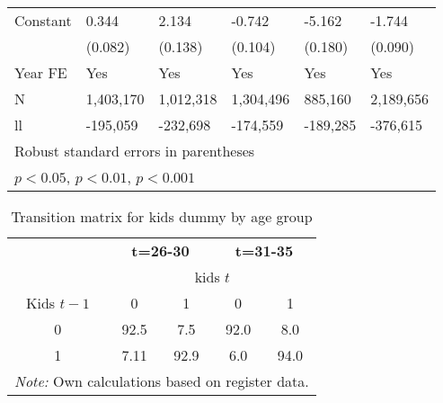 \begin{table}[h!]
\begin{tabular}{p{5cm} p{2cm}p{2cm}p{2cm}p{2cm}p{2cm}}
Constant            &       0.344\sym{***}&       2.134\sym{***}&      -0.742\sym{***}&      -5.162\sym{***}&      -1.744\sym{***}\\
                    &     (0.082)         &     (0.138)         &     (0.104)         &     (0.180)         &     (0.090)         \\

Year FE             &         Yes         &         Yes         &         Yes         &         Yes         &         Yes         \\
\midrule
N                   &     1,403,170         &     1,012,318         &     1,304,496         &      885,160         &     2,189,656         \\
ll                  &   -195,059         &   -232,698         &   -174,559         &   -189,285         &   -376,615         \\
\bottomrule
\multicolumn{6}{l}{\footnotesize Robust standard errors in parentheses}\\
\multicolumn{6}{l}{\footnotesize \sym{*} \(p<0.05\), \sym{**} \(p<0.01\), \sym{***} \(p<0.001\)}\\
\end{tabular}
\end{table}


\renewcommand{\arraystretch}{1}
\begin{table}[h!]\centering
\footnotesize
\def\sym#1{\ifmmode^{#1}\else\(^{#1}\)\fi}
\caption{Transition matrix for kids dummy by age group \label{tab:apkids}}
\begin{tabular}{c|cc|cc}
\toprule
                    &\multicolumn{2}{c}{  \textbf{t=26-30}  }&\multicolumn{2}{c}{\textbf{t=31-35}}\\
                    &\multicolumn{4}{c}{ kids $t$}\\
\midrule
 Kids $t-1$                   & 0 & 1 & 0 & 1 \\ \hdashline

0                   &92.5 & 7.5 & 92.0 & 8.0 \\ 
1                   & 7.11 & 92.9 & 6.0 &94.0 \\
\bottomrule
\multicolumn{5}{c}{\footnotesize \emph{Note:} Own calculations based on register data.}\\
\end{tabular}
\end{table}

